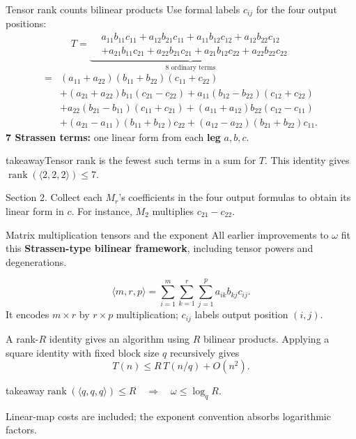 \documentclass[aspectratio=169,11pt]{beamer}
\newcommand{\rank}{\operatorname{rank}}
\newcommand{\cmm}[3]{\langle #1,#2,#3\rangle}
\newcommand{\source}[1]{\vfill\par{\fontsize{7.5}{9}\selectfont\color{muted}#1\par}}
\newcommand{\takeaway}[1]{\begin{beamercolorbox}[sep=0.65em,wd=\linewidth]{takeaway}#1\end{beamercolorbox}}
\begin{document}
\begin{frame}{Tensor rank counts bilinear products}
  Use formal labels $c_{ij}$ for the four output positions:
  \[
    T=\underbrace{
      \begin{aligned}
        &a_{11}b_{11}c_{11}+a_{12}b_{21}c_{11}
          +a_{11}b_{12}c_{12}+a_{12}b_{22}c_{12}\\
        &+a_{21}b_{11}c_{21}+a_{22}b_{21}c_{21}
          +a_{21}b_{12}c_{22}+a_{22}b_{22}c_{22}
      \end{aligned}
    }_{\text{8 ordinary terms}}
  \]
  \[
  \begin{aligned}
    ={}&(a_{11}+a_{22})(b_{11}+b_{22})(c_{11}+c_{22})\\
       &+(a_{21}+a_{22})b_{11}(c_{21}-c_{22})
         +a_{11}(b_{12}-b_{22})(c_{12}+c_{22})\\
       &+a_{22}(b_{21}-b_{11})(c_{11}+c_{21})
         +(a_{11}+a_{12})b_{22}(c_{12}-c_{11})\\
       &+(a_{21}-a_{11})(b_{11}+b_{12})c_{22}
         +(a_{12}-a_{22})(b_{21}+b_{22})c_{11}.
  \end{aligned}
  \]
  \textbf{7 Strassen terms:} one linear form from each \textbf{leg} $a,b,c$.
  \takeaway{Tensor rank is the fewest such terms in a sum for $T$.
    This identity gives $\rank(\cmm{2}{2}{2})\le7$.}
  \source{Section 2. Collect each $M_r$'s coefficients in the four output formulas
  to obtain its linear form in $c$. For instance, $M_2$ multiplies $c_{21}-c_{22}$.}
\end{frame}

\begin{frame}{Matrix multiplication tensors and the exponent}
  All earlier improvements to $\omega$ fit this \textbf{Strassen-type bilinear
  framework}, including tensor powers and degenerations.
  \par\medskip
  \[
    \cmm{m}{r}{p}
    =\sum_{i=1}^{m}\sum_{k=1}^{r}\sum_{j=1}^{p}
      a_{ik}b_{kj}c_{ij}.
  \]
  It encodes $m\times r$ by $r\times p$ multiplication;
  $c_{ij}$ labels output position $(i,j)$.
  \par\medskip
  A rank-$R$ identity gives an algorithm using $R$ bilinear products.
  Applying a square identity with fixed block size $q$ recursively gives
  \[
    T(n)\le R\,T(n/q)+O(n^2).
  \]
  \takeaway{$\displaystyle
    \rank(\cmm{q}{q}{q})\le R
    \quad\Longrightarrow\quad \omega\le\log_q R.
  $}
  \source{Linear-map costs are
  included; the exponent convention absorbs logarithmic factors.}
\end{frame}
\end{document}
